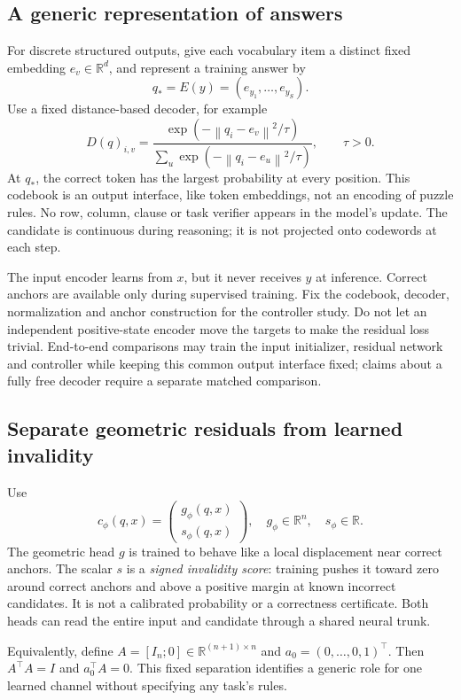 \documentclass[11pt,a4paper]{article}
\newcommand{\norm}[1]{\left\lVert #1\right\rVert}
\begin{document}
\subsection{A generic representation of answers}
For discrete structured outputs, give each vocabulary item a distinct fixed embedding $e_v\in\mathbb R^d$, and represent a training answer by
\[
q_*=E(y)=(e_{y_1},\ldots,e_{y_S}).
\]
Use a fixed distance-based decoder, for example
\[
D(q)_{i,v}=\frac{\exp(-\norm{q_i-e_v}^2/\tau)}{\sum_u\exp(-\norm{q_i-e_u}^2/\tau)},\qquad \tau>0.
\]
At $q_*$, the correct token has the largest probability at every position. This codebook is an output interface, like token embeddings, not an encoding of puzzle rules. No row, column, clause or task verifier appears in the model's update. The candidate is continuous during reasoning; it is not projected onto codewords at each step.

The input encoder learns from $x$, but it never receives $y$ at inference. Correct anchors are available only during supervised training. Fix the codebook, decoder, normalization and anchor construction for the controller study. Do not let an independent positive-state encoder move the targets to make the residual loss trivial. End-to-end comparisons may train the input initializer, residual network and controller while keeping this common output interface fixed; claims about a fully free decoder require a separate matched comparison.

\subsection{Separate geometric residuals from learned invalidity}
Use
\begin{equation}
c_\phi(q,x)=\begin{pmatrix}g_\phi(q,x)\\s_\phi(q,x)\end{pmatrix},
\quad g_\phi\in\mathbb R^n,\quad s_\phi\in\mathbb R.\label{eq:split}
\end{equation}
The geometric head $g$ is trained to behave like a local displacement near correct anchors. The scalar $s$ is a \emph{signed invalidity score}: training pushes it toward zero around correct anchors and above a positive margin at known incorrect candidates. It is not a calibrated probability or a correctness certificate. Both heads can read the entire input and candidate through a shared neural trunk.

Equivalently, define $A=[I_n;0]\in\mathbb R^{(n+1)\times n}$ and $a_0=(0,\ldots,0,1)^\top$. Then $A^\top A=I$ and $a_0^\top A=0$. This fixed separation identifies a generic role for one learned channel without specifying any task's rules.
\end{document}
